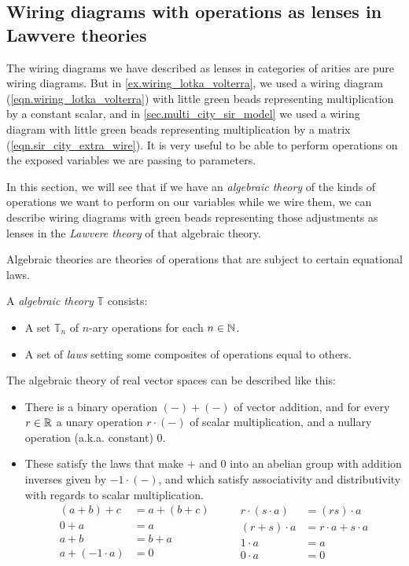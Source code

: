 \documentclass[DynamicalBook]{subfiles}
\begin{document}
\subsection{Wiring diagrams with operations as lenses in Lawvere theories}\label{sec:wiring.diagrams.Lawvere}

The wiring diagrams we have described as lenses in categories of arities are
pure wiring diagrams. But in \cref{ex.wiring_lotka_volterra}, we used a wiring
diagram (\cref{eqn.wiring_lotka_volterra}) with little green beads representing multiplication by a constant
scalar, and in \cref{sec.multi_city_sir_model} we used a wiring diagram with
little green beads representing multiplication by a matrix
(\cref{eqn.sir_city_extra_wire}). It is very useful to be able to perform
operations on the exposed variables we
are passing to parameters.

In this section, we will see that if we have an \emph{algebraic theory} of the
kinds of operations we want to perform on our variables while we wire them, we can
describe wiring diagrams with green beads representing those adjustments as
lenses in the \emph{Lawvere theory} of that algebraic theory.

Algebraic theories are theories of operations that are subject to certain
equational laws.
\begin{informal}
A \emph{algebraic theory} $\mathbb{T}$ consists:
\begin{itemize}
  \item A set $\mathbb{T}_n$ of $n$-ary operations for each $n \in \mathbb{N}$.
  \item A set of \emph{laws} setting some composites of operations equal to others.
\end{itemize}
\end{informal}

\begin{example}\label{ex.vector_theory}
The algebraic theory of real vector spaces can be described like this:
\begin{itemize}
\item There is a binary operation $(-)+(-)$ of vector addition, and for every $r \in
  \mathbb{R}$ a unary operation $r\cdot(-)$ of scalar multiplication, and a nullary
  operation (a.k.a. constant) $0$.
\item These satisfy the laws that make $+$ and $0$ into an abelian group with
  addition inverses given by $-1 \cdot(-)$, and which satisfy associativity and
  distributivity with regards to scalar multiplication.
\[
\begin{aligned}
(a + b) + c &= a + (b + c)\\
0 + a &= a \\
a + b &= b + a \\
a + (-1 \cdot a) &= 0
\end{aligned}
\quad\quad
\begin{aligned}
r \cdot (s \cdot a) &= (rs) \cdot a \\
(r + s) \cdot a &= r \cdot a + s \cdot a \\
 1 \cdot a &= a\\
 0 \cdot a &= 0
\end{aligned}
\]
\end{itemize}
\end{example}
\end{document}
